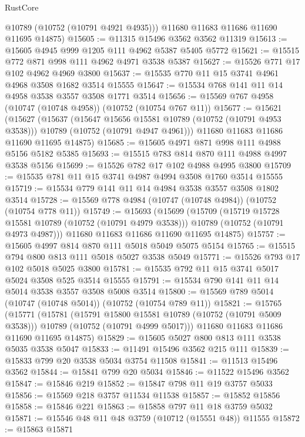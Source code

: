 \begin{lexlean}{RustCore}
\begin{coremodule}
        @10789
        (@10752 (@10791 @4921 @4935)))
      @11680
      @11683
      @11686
      @11690
      @11695
      @14875)
@15605 := @11315 @15496 @3562 @3562 @11319
@15613 := @15605 @4945 @999 @1205 @111 @4962 @5387 @5405 @5772
@15621 := @15515 @772 @871 @998 @111 @4962 @4971 @3538 @5387
@15627 := @15526 @771 @17 @102 @4962 @4969 @3800
@15637 := @15535 @770 @11 @15 @3741 @4961 @4968 @3508 @1682 @3514 @15555
@15647 := @15534 @768 @141 @11 @14 @4958 @3538 @3557 @3508 @1771 @3514
@15656 := @15569 @767 @4958 (@10747 (@10748 @4958)) (@10752 (@10754 @767 @11))
@15677 := @15621
    (@15627
      (@15637
        (@15647 @15656 @15581 @10789 (@10752 (@10791 @4953 @3538)))
        @10789
        (@10752 (@10791 @4947 @4961)))
      @11680
      @11683
      @11686
      @11690
      @11695
      @14875)
@15685 := @15605 @4971 @871 @998 @111 @4988 @5156 @5182 @5385
@15693 := @15515 @783 @814 @870 @111 @4988 @4997 @3538 @5156
@15699 := @15526 @782 @17 @102 @4988 @4995 @3800
@15709 := @15535 @781 @11 @15 @3741 @4987 @4994 @3508 @1760 @3514 @15555
@15719 := @15534 @779 @141 @11 @14 @4984 @3538 @3557 @3508 @1802 @3514
@15728 := @15569 @778 @4984 (@10747 (@10748 @4984)) (@10752 (@10754 @778 @11))
@15749 := @15693
    (@15699
      (@15709
        (@15719 @15728 @15581 @10789 (@10752 (@10791 @4979 @3538)))
        @10789
        (@10752 (@10791 @4973 @4987)))
      @11680
      @11683
      @11686
      @11690
      @11695
      @14875)
@15757 := @15605 @4997 @814 @870 @111 @5018 @5049 @5075 @5154
@15765 := @15515 @794 @800 @813 @111 @5018 @5027 @3538 @5049
@15771 := @15526 @793 @17 @102 @5018 @5025 @3800
@15781 := @15535 @792 @11 @15 @3741 @5017 @5024 @3508 @525 @3514 @15555
@15791 := @15534 @790 @141 @11 @14 @5014 @3538 @3557 @3508 @5008 @3514
@15800 := @15569 @789 @5014 (@10747 (@10748 @5014)) (@10752 (@10754 @789 @11))
@15821 := @15765
    (@15771
      (@15781
        (@15791 @15800 @15581 @10789 (@10752 (@10791 @5009 @3538)))
        @10789
        (@10752 (@10791 @4999 @5017)))
      @11680
      @11683
      @11686
      @11690
      @11695
      @14875)
@15829 := @15605 @5027 @800 @813 @111 @3538 @5035 @3538 @5047
@15833 := @11491 @15496 @3562 @215 @111
@15839 := @15833 @799 @20 @3538 @5034 @3754 @11508
@15841 := @11513 @15496 @3562
@15844 := @15841 @799 @20 @5034
@15846 := @11522 @15496 @3562
@15847 := @15846 @219
@15852 := @15847 @798 @11 @19 @3757 @5033
@15856 := @15569 @218 @3757 @11534 @11538
@15857 := @15852 @15856
@15858 := @15846 @221
@15863 := @15858 @797 @11 @18 @3759 @5032
@15871 := @15546 @48 @11 @48 @3759 (@10712 (@15551 @48)) @11555
@15872 := @15863 @15871

\end{coremodule}
\end{lexlean}
